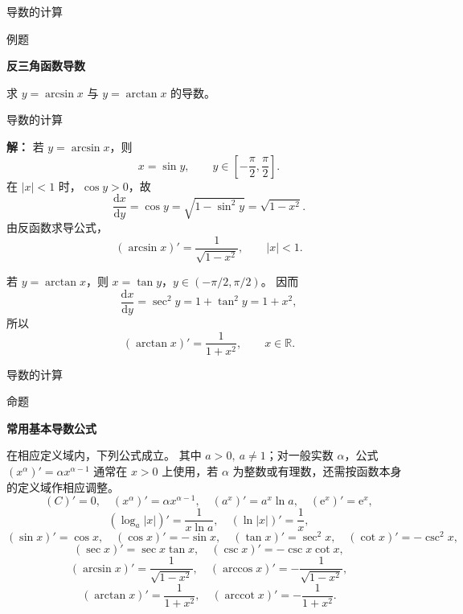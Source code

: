 \documentclass[aspectratio=169,10pt,fontset=fandol]{ctexbeamer}
\newcommand{\dd}{\mathrm{d}}
\newcommand{\ee}{\mathrm{e}}
\newcommand{\RR}{\mathbb{R}}
\begin{document}
\begin{frame}[t,fragile]{导数的计算}
\footnotesize
\begin{block}{例题}
{\footnotesize
\textbf{反三角函数导数}\par

求 $y=\arcsin x$ 与 $y=\arctan x$ 的导数。

}
\end{block}
\end{frame}
\begin{frame}[t,fragile]{导数的计算}
\footnotesize
{\footnotesize
\textbf{解：}
若 $y=\arcsin x$，则
\[
x=\sin y,\qquad y\in\left[-\frac{\pi}{2},\frac{\pi}{2}\right].
\]
在 $|x|<1$ 时，$\cos y>0$，故
\[
\frac{\dd x}{\dd y}=\cos y=\sqrt{1-\sin^2y}=\sqrt{1-x^2}.
\]
由反函数求导公式，
\[
(\arcsin x)'=\frac{1}{\sqrt{1-x^2}},\qquad |x|<1.
\]

若 $y=\arctan x$，则 $x=\tan y$，$y\in(-\pi/2,\pi/2)$。 因而
\[
\frac{\dd x}{\dd y}=\sec^2y=1+\tan^2y=1+x^2,
\]
所以
\[
(\arctan x)'=\frac1{1+x^2},\qquad x\in\RR.
\]

}
\end{frame}
\begin{frame}[t,fragile]{导数的计算}
\small
\begin{block}{命题}
{\small
\textbf{常用基本导数公式}\par

	在相应定义域内，下列公式成立。 其中 $a>0,\ a\neq1$；对一般实数 $\alpha$，公式 $(x^\alpha)'=\alpha x^{\alpha-1}$ 通常在 $x>0$ 上使用，若 $\alpha$ 为整数或有理数，还需按函数本身的定义域作相应调整。
	\[
	(C)'=0,\quad (x^\alpha)'=\alpha x^{\alpha-1},\quad (a^x)'=a^x\ln a,\quad (\ee^x)'=\ee^x,
	\]
	\[
	(\log_a |x|)'=\frac1{x\ln a},\quad (\ln |x|)'=\frac1x,
	\]
	\[
	(\sin x)'=\cos x,\quad (\cos x)'=-\sin x,\quad
	(\tan x)'=\sec^2x,\quad (\cot x)'=-\csc^2x,
	\]
	\[
	(\sec x)'=\sec x\tan x,\quad (\csc x)'=-\csc x\cot x,
	\]
	\[
	(\arcsin x)'=\frac1{\sqrt{1-x^2}},\quad
	(\arccos x)'=-\frac1{\sqrt{1-x^2}},
	\]
	\[
	(\arctan x)'=\frac1{1+x^2},\quad
	(\operatorname{arccot}x)'=-\frac1{1+x^2}.
	\]

}
\end{block}
\end{frame}
\end{document}
